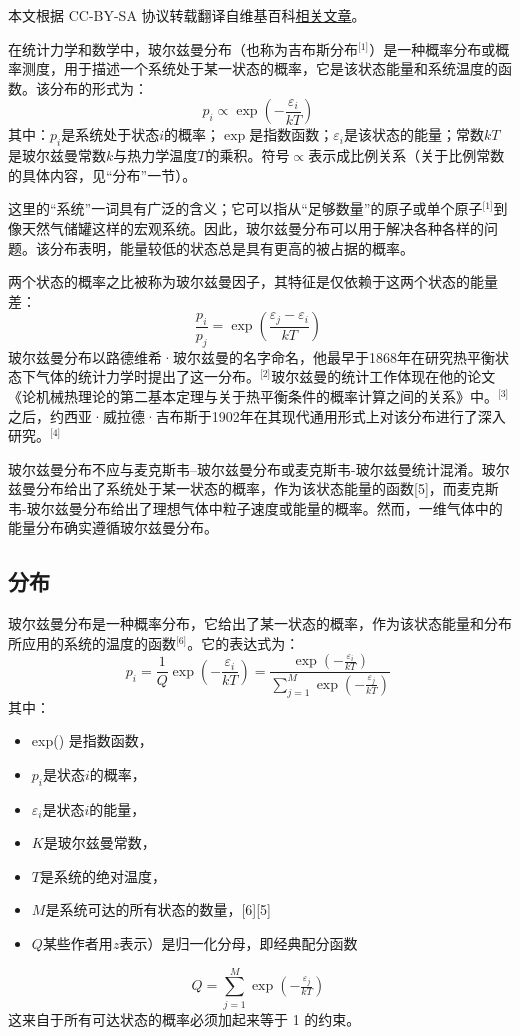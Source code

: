 
本文根据 CC-BY-SA 协议转载翻译自维基百科\href{https://en.wikipedia.org/wiki/Boltzmann_distribution}{相关文章}。

在统计力学和数学中，玻尔兹曼分布（也称为吉布斯分布\(^\text{[1]}\)）是一种概率分布或概率测度，用于描述一个系统处于某一状态的概率，它是该状态能量和系统温度的函数。该分布的形式为：
\[
p_i \propto \exp\left(-\frac{\varepsilon_i}{kT}\right)~
\]
其中：\( p_i \)是系统处于状态\( i \)的概率；\( \exp \)是指数函数；\( \varepsilon_i \)是该状态的能量；常数\( kT \)是玻尔兹曼常数\( k \)与热力学温度\( T \)的乘积。符号\( \propto \)表示成比例关系（关于比例常数的具体内容，见“分布”一节）。

这里的“系统”一词具有广泛的含义；它可以指从“足够数量”的原子或单个原子\(^\text{[1]}\)到像天然气储罐这样的宏观系统。因此，玻尔兹曼分布可以用于解决各种各样的问题。该分布表明，能量较低的状态总是具有更高的被占据的概率。

两个状态的概率之比被称为玻尔兹曼因子，其特征是仅依赖于这两个状态的能量差：
\[
\frac{p_i}{p_j} = \exp\left(\frac{\varepsilon_j - \varepsilon_i}{kT}\right)~
\]
玻尔兹曼分布以路德维希·玻尔兹曼的名字命名，他最早于1868年在研究热平衡状态下气体的统计力学时提出了这一分布。\(^\text{[2]}\)玻尔兹曼的统计工作体现在他的论文《论机械热理论的第二基本定理与关于热平衡条件的概率计算之间的关系》中。\(^\text{[3]}\)之后，约西亚·威拉德·吉布斯于1902年在其现代通用形式上对该分布进行了深入研究。\(^\text{[4]}\)

玻尔兹曼分布不应与麦克斯韦–玻尔兹曼分布或麦克斯韦-玻尔兹曼统计混淆。玻尔兹曼分布给出了系统处于某一状态的概率，作为该状态能量的函数[5]，而麦克斯韦-玻尔兹曼分布给出了理想气体中粒子速度或能量的概率。然而，一维气体中的能量分布确实遵循玻尔兹曼分布。
\subsection{分布}  
玻尔兹曼分布是一种概率分布，它给出了某一状态的概率，作为该状态能量和分布所应用的系统的温度的函数\(^\text{[6]}\)。它的表达式为：
\[
p_i = \frac{1}{Q} \exp\left(-\frac{\varepsilon_i}{kT}\right) = \frac{\exp\left(-\frac{\varepsilon_i}{kT}\right)}{\sum _{j=1}^{M}\exp\left(-\frac{\varepsilon_j}{kT}\right)}~
\]
其中：
\begin{itemize}
\item exp() 是指数函数，  
\item \(p_i\)是状态\(i\)的概率，  
\item \(\varepsilon_i\)是状态\(i\)的能量，  
\item \(K\)是玻尔兹曼常数，  
\item \(T\)是系统的绝对温度，  
\item \(M\)是系统可达的所有状态的数量，[6][5]  
\item \(Q\)某些作者用\(z\)表示）是归一化分母，即经典配分函数  
\end{itemize} 
\[{\displaystyle Q=\sum _{j=1}^{M}\exp \left(-{\tfrac {\varepsilon _{j}}{kT}}\right)}~\]
这来自于所有可达状态的概率必须加起来等于 1 的约束。

